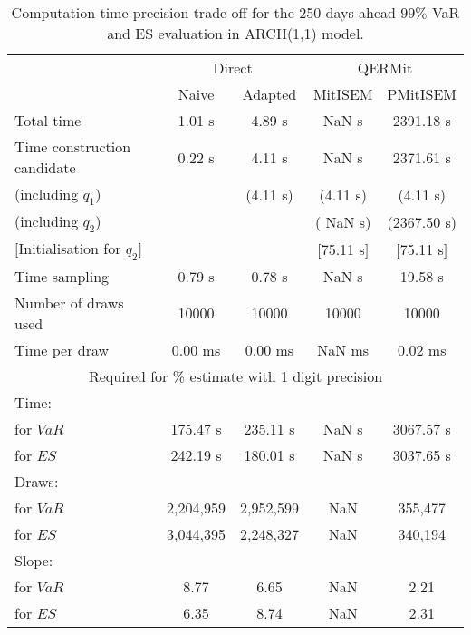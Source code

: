 { \renewcommand{\arraystretch}{1.3} 
\begin{table}[h] 
\centering 
\caption{Computation time-precision trade-off for the 250-days ahead  $99\%$ VaR and ES evaluation in ARCH(1,1) model.} 
\label{tab:time_precision_arch} 
\begin{tabular}{lcccc}  
  & \multicolumn{2}{c}{Direct} & \multicolumn{2}{c}{QERMit}  \\ \cline{2-5} 
  & Naive & Adapted & MitISEM & PMitISEM  \\ \hline 
Total time & 1.01 s & 4.89 s &  NaN s & 2391.18 s \\ 
Time construction candidate & 0.22 s & 4.11 s &  NaN s & 2371.61 s \\ 
 (including $q_{1}$) &   &  (4.11 s) & (4.11 s) & (4.11 s) \\ 
 (including $q_{2}$) &   &  & ( NaN s) & (2367.50 s) \\ 
$[$Initialisation for $q_{2}$$]$&   &   & $[$75.11 s$]$ & $[$75.11 s$]$ \\ 
Time sampling & 0.79 s & 0.78 s &  NaN s & 19.58 s  \\  
Number of draws used & 10000 & 10000 & 10000 & 10000 \\ 
Time per draw & 0.00 ms & 0.00 ms &  NaN ms & 0.02 ms \\ \hline 
\multicolumn{5}{c}{Required for \% estimate with 1 digit precision} \\ \hline 
Time: &  &  &   &  \\ 
\hspace{1cm} for $VaR$ & 175.47 s & 235.11 s &  NaN s & 3067.57 s \\ 
\hspace{1cm} for $ES$ & 242.19 s & 180.01 s &  NaN s & 3037.65 s \\ 
Draws: &  &  &   &  \\ 
\hspace{1cm} for $VaR$ & 2,204,959 & 2,952,599  & NaN  & 355,477  \\ 
\hspace{1cm} for $ES$ & 3,044,395 & 2,248,327  & NaN   & 340,194  \\ 
\hline 
Slope: &  &  &   &  \\ 
\hspace{1cm} for $VaR$ & 8.77 & 6.65  &  NaN  & 2.21  \\ 
\hspace{1cm} for $ES$ & 6.35 & 8.74  &  NaN   & 2.31  \\  \hline 
\end{tabular} 
\end{table} 
} 
